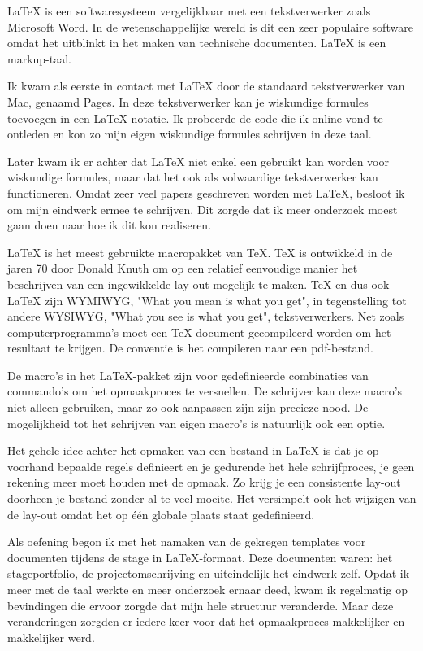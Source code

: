 \LaTeX{} is een softwaresysteem vergelijkbaar met een tekstverwerker zoals Microsoft Word. In de wetenschappelijke wereld is dit een zeer populaire software omdat het uitblinkt in het maken van technische documenten. \LaTeX{} is een markup\hyp{}taal.

Ik kwam als eerste in contact met \LaTeX{} door de standaard tekstverwerker van Mac, genaamd Pages. In deze tekstverwerker kan je wiskundige formules toevoegen in een \LaTeX{}\hyp{}notatie. Ik probeerde de code die ik online vond te ontleden en kon zo mijn eigen wiskundige formules schrijven in deze taal.

Later kwam ik er achter dat \LaTeX{} niet enkel een gebruikt kan worden voor wiskundige formules, maar dat het ook als volwaardige tekstverwerker kan functioneren. Omdat zeer veel papers geschreven worden met \LaTeX{}, besloot ik om mijn eindwerk ermee te schrijven. Dit zorgde dat ik meer onderzoek moest gaan doen naar hoe ik dit kon realiseren.

\LaTeX{} is het meest gebruikte macropakket van \TeX{}. \TeX{} is ontwikkeld in de jaren 70 door Donald Knuth om op een relatief eenvoudige manier het beschrijven van een ingewikkelde lay\hyp{}out mogelijk te maken. \TeX{} en dus ook \LaTeX{} zijn WYMIWYG, "What you mean is what you get", in tegenstelling tot andere WYSIWYG, "What you see is what you get", tekstverwerkers. Net zoals computerprogramma's moet een \TeX{}\hyp{}document gecompileerd worden om het resultaat te krijgen. De conventie is het compileren naar een pdf\hyp{}bestand.

De macro's in het \LaTeX{}\hyp{}pakket zijn voor gedefinieerde combinaties van commando's om het opmaakproces te versnellen. De schrijver kan deze macro's niet alleen gebruiken, maar zo ook aanpassen zijn zijn precieze nood. De mogelijkheid tot het schrijven van eigen macro's is natuurlijk ook een optie.

Het gehele idee achter het opmaken van een bestand in \LaTeX{} is dat je op voorhand bepaalde regels definieert en je gedurende het hele schrijfproces, je geen rekening meer moet houden met de opmaak. Zo krijg je een consistente lay\hyp{}out doorheen je bestand zonder al te veel moeite. Het versimpelt ook het wijzigen van de lay\hyp{}out omdat het op één globale plaats staat gedefinieerd.

Als oefening begon ik met het namaken van de gekregen templates voor documenten tijdens de stage in \LaTeX{}\hyp{}formaat. Deze documenten waren: het stageportfolio, de projectomschrijving en uiteindelijk het eindwerk zelf. Opdat ik meer met de taal werkte en meer onderzoek ernaar deed, kwam ik regelmatig op bevindingen die ervoor zorgde dat mijn hele structuur veranderde. Maar deze veranderingen zorgden er iedere keer voor dat het opmaakproces makkelijker en makkelijker werd.

